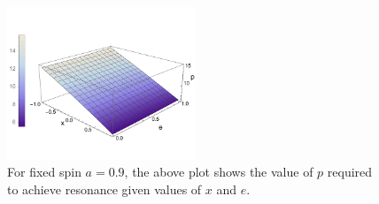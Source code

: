 \begin{figure}
    \centering
    \includegraphics[width=0.5\textwidth]{images/pexplot.pdf}
    \caption[Plot of $p$-$e$-$x$ plane for resonant parameter values]{For fixed spin $a=0.9$, the above plot shows the value of $p$ required to achieve resonance given values of $x$ and $e$.}
    \label{fig:pexplot}
\end{figure}

